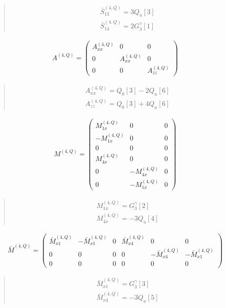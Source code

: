 \documentclass[fleqn,10pt]{jsarticle}
\begin{document}
\begin{quote}
\begin{align*}
& \bar{S}^{(4,Q)}_{13} = 3 Q_{u}[3] \\
& \bar{S}^{(4,Q)}_{14} = 2 G_{3}^{\gamma}[1]
\end{align*}
\end{quote}
\begin{align*}
A^{(4,Q)} = \begin{pmatrix} A^{(4,Q)}_{xx} & 0 & 0 \\ 0 & A^{(4,Q)}_{xx} & 0 \\ 0 & 0 & A^{(4,Q)}_{zz} \end{pmatrix}
\end{align*}
\begin{quote}
\begin{align*}
& A^{(4,Q)}_{xx} = Q_{0}[3] - 2 Q_{u}[6] \\
& A^{(4,Q)}_{zz} = Q_{0}[3] + 4 Q_{u}[6]
\end{align*}
\end{quote}
\begin{align*}
M^{(4,Q)} = \begin{pmatrix} M^{(4,Q)}_{1x} & 0 & 0 \\ - M^{(4,Q)}_{1x} & 0 & 0 \\ 0 & 0 & 0 \\ M^{(4,Q)}_{4x} & 0 & 0 \\ 0 & - M^{(4,Q)}_{4x} & 0 \\ 0 & - M^{(4,Q)}_{1x} & 0 \end{pmatrix}
\end{align*}
\begin{quote}
\begin{align*}
& M^{(4,Q)}_{1x} = G_{3}^{\gamma}[2] \\
& M^{(4,Q)}_{4x} = - 3 Q_{u}[4]
\end{align*}
\end{quote}
\begin{align*}
\bar{M}^{(4,Q)} = \begin{pmatrix} \bar{M}^{(4,Q)}_{x1} & - \bar{M}^{(4,Q)}_{x1} & 0 & \bar{M}^{(4,Q)}_{x4} & 0 & 0 \\ 0 & 0 & 0 & 0 & - \bar{M}^{(4,Q)}_{x4} & - \bar{M}^{(4,Q)}_{x1} \\ 0 & 0 & 0 & 0 & 0 & 0 \end{pmatrix}
\end{align*}
\begin{quote}
\begin{align*}
& \bar{M}^{(4,Q)}_{x1} = G_{3}^{\gamma}[3] \\
& \bar{M}^{(4,Q)}_{x4} = - 3 Q_{u}[5]
\end{align*}
\end{quote}
\end{document}
